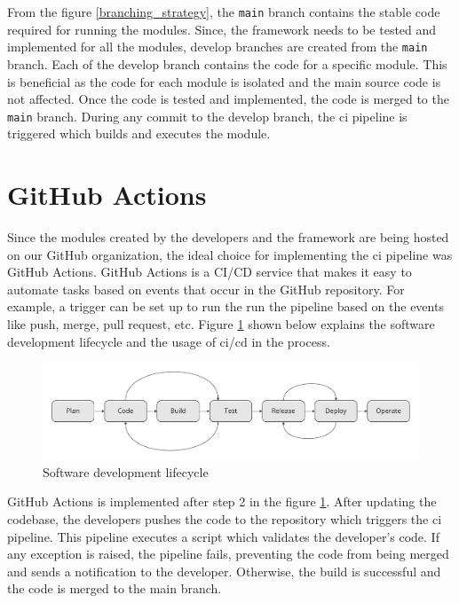 From the figure \ref{branching_strategy}, the \texttt{main} branch contains the stable code required for running the modules. Since, the framework needs to be
tested and implemented for all the modules, develop branches are created from the \texttt{main} branch. Each of the develop branch contains the code for a 
specific module. This is beneficial as the code for each module is isolated and the main source code is not affected. Once the code is tested and implemented, 
the code is merged to the \texttt{main} branch. During any commit to the develop branch, the \acrshort{ci} pipeline is triggered which builds and executes the 
module.

\section{GitHub Actions}
Since the modules created by the developers and the framework are being hosted on our GitHub organization, the ideal choice for implementing the \acrshort{ci} pipeline was GitHub Actions.
GitHub Actions is a CI/CD service that makes it easy to automate tasks based on events that occur in the GitHub repository\cite{9463074}. For example, a 
trigger can be set up to run the run the pipeline based on the events like push, merge, pull request, etc. Figure \ref{github_actions_flowchart} shown below
explains the software development lifecycle and the usage of \acrshort{ci}/\acrshort{cd} in the process.\newline
\begin{figure}[!ht]
    \centering
    \includegraphics[width=1\textwidth]{Images/github_actions_flowchart.pdf}
    \caption{Software development lifecycle}
    \label{github_actions_flowchart}
\end{figure}

GitHub Actions is implemented after step 2 in the figure \ref{github_actions_flowchart}. After updating the codebase, the developers pushes the code to the
repository which triggers the \acrshort{ci} pipeline. This pipeline executes a script which validates the developer's code. If any exception is 
raised, the pipeline fails, preventing the code from being merged and sends a notification to the developer. Otherwise, the build is successful and the code 
is merged to the main branch.

